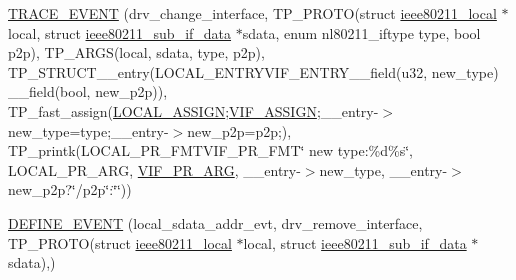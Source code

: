 \begin{DoxyCompactItemize}
\hyperlink{driver-trace_8h_abab974f7d1d6ac5ada7f8810fc7ae859}{T\-R\-A\-C\-E\-\_\-\-E\-V\-E\-N\-T} (drv\-\_\-change\-\_\-interface, T\-P\-\_\-\-P\-R\-O\-T\-O(struct \hyperlink{structieee80211__local}{ieee80211\-\_\-local} $\ast$local, struct \hyperlink{structieee80211__sub__if__data}{ieee80211\-\_\-sub\-\_\-if\-\_\-data} $\ast$sdata, enum nl80211\-\_\-iftype type, bool p2p), T\-P\-\_\-\-A\-R\-G\-S(local, sdata, type, p2p), T\-P\-\_\-\-S\-T\-R\-U\-C\-T\-\_\-\-\_\-entry(L\-O\-C\-A\-L\-\_\-\-E\-N\-T\-R\-Y\-V\-I\-F\-\_\-\-E\-N\-T\-R\-Y\-\_\-\-\_\-field(u32, new\-\_\-type) \-\_\-\-\_\-field(bool, new\-\_\-p2p)), T\-P\-\_\-fast\-\_\-assign(\hyperlink{driver-trace_8h_ab19d9141887ea92ef9640df06a51e0a1}{L\-O\-C\-A\-L\-\_\-\-A\-S\-S\-I\-G\-N};\hyperlink{driver-trace_8h_af5ede80f04ffcb3f644f68837b1d252c}{V\-I\-F\-\_\-\-A\-S\-S\-I\-G\-N};\-\_\-\-\_\-entry-\/$>$new\-\_\-type=type;\-\_\-\-\_\-entry-\/$>$new\-\_\-p2p=p2p;), T\-P\-\_\-printk(L\-O\-C\-A\-L\-\_\-\-P\-R\-\_\-\-F\-M\-T\-V\-I\-F\-\_\-\-P\-R\-\_\-\-F\-M\-T\char`\"{} new type\-:\%d\%s\char`\"{}, L\-O\-C\-A\-L\-\_\-\-P\-R\-\_\-\-A\-R\-G, \hyperlink{driver-trace_8h_a12c9f3afcd1c461f7ae2f86fd8503977}{V\-I\-F\-\_\-\-P\-R\-\_\-\-A\-R\-G}, \-\_\-\-\_\-entry-\/$>$new\-\_\-type, \-\_\-\-\_\-entry-\/$>$new\-\_\-p2p?\char`\"{}/p2p\char`\"{}\-:\char`\"{}\char`\"{}))
\item 
\hyperlink{driver-trace_8h_a658149dd42f7cc5008b0afca92fc0b21}{D\-E\-F\-I\-N\-E\-\_\-\-E\-V\-E\-N\-T} (local\-\_\-sdata\-\_\-addr\-\_\-evt, drv\-\_\-remove\-\_\-interface, T\-P\-\_\-\-P\-R\-O\-T\-O(struct \hyperlink{structieee80211__local}{ieee80211\-\_\-local} $\ast$local, struct \hyperlink{structieee80211__sub__if__data}{ieee80211\-\_\-sub\-\_\-if\-\_\-data} $\ast$sdata),)
\item 

\end{DoxyCompactItemize}

